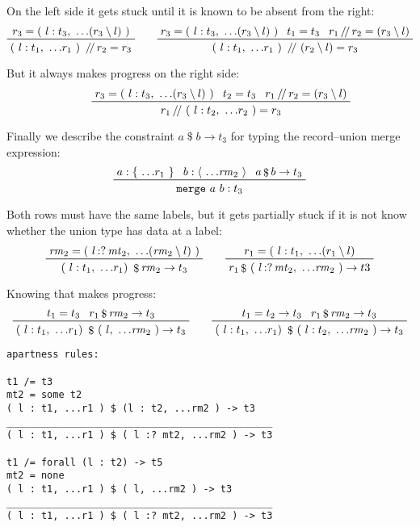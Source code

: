 \documentclass[11pt, twoside, reqno]{book}
\begin{document}
On the left side it gets stuck until it is known to be absent from the right:
\begin{displaymath}
\prftree
  {r_3 = (\ l : t_3,\ \dots\!(r_3 \setminus l)\ )}
  {(\ l : t_1,\ \dots\!r_1\ )\ \mathop{/\!/} r_2 = r_3}
\qquad
\prftree
  {r_3 = (\ l : t_3,\ \dots\!(r_3 \setminus l)\ )}
  {t_1 = t_3}
  {r_1 \mathop{/\!/} r_2 = (r_3 \setminus l)}
  {(\ l : t_1,\ \dots\!r_1\ )\ \mathop{/\!/}\ (r_2 \setminus l) = r_3}
\end{displaymath}

But it always makes progress on the right side:
\begin{displaymath}
\qquad
\prftree
  {r_3 = (\ l : t_3,\ \dots\!(r_3 \setminus l)\ )}
  {t_2 = t_3}
  {r_1 \mathop{/\!/} r_2 = (r_3 \setminus l)}
  {r_1 \mathop{/\!/}\ (\ l : t_2,\ \dots\!r_2\ ) = r_3}
\end{displaymath}

Finally we describe the constraint $a \mathop{\$} b \to t_3$ for typing the record--union merge expression:
\begin{displaymath}
\prftree{a : \{\ \dots\!r_1\ \}}{b : \langle\ \dots\!\mathit{rm}_2\ \rangle}{a \mathop{\$} b \to t_3}{\texttt{merge}\ a\ b : t_3}
\end{displaymath}

Both rows must have the same labels, but it gets partially stuck if it is not know whether the union type has data at a label:
\begin{displaymath}
\prftree{\mathit{rm}_2 = (\ l \mathop{{:}{?}} \mathit{mt}_2,\ \dots\!(\mathit{rm}_2 \setminus l)\ )}{(\ l : t_1,\ \dots\!r_1 )\ \mathop{\$} \mathit{rm}_2 \to t_3}
\qquad
\prftree{r_1 = (\ l : t_1,\ \dots\!(r_1 \setminus l)}{r_1 \mathop{\$}\ (\ l \mathop{{:}{?}} \mathit{mt}_2,\ \dots\!\mathit{rm}_2\ ) \to t3}
\end{displaymath}

Knowing that makes progress:
\begin{displaymath}
\prftree{t_1 = t_3}{r_1 \mathop{\$} \mathit{rm}_2 \to t_3}
  {(\ l : t_1,\ \dots\!r_1 )\ \mathop{\$}\ (\ l,\ \dots\!\mathit{rm}_2\ ) \to t_3}
\qquad
\prftree{t_1 = t_2 \to t_3}{r_1 \mathop{\$} \mathit{rm}_2 \to t_3}
  {(\ l : t_1,\ \dots\!r_1 )\ \mathop{\$}\ (\ l : t_2,\ \dots\!\mathit{rm}_2\ ) \to t_3}
\end{displaymath}

\begin{verbatim}
apartness rules:

t1 /= t3
mt2 = some t2
( l : t1, ...r1 ) $ (l : t2, ...rm2 ) -> t3
______________________________________________
( l : t1, ...r1 ) $ ( l :? mt2, ...rm2 ) -> t3

t1 /= forall (l : t2) -> t5
mt2 = none
( l : t1, ...r1 ) $ ( l, ...rm2 ) -> t3
______________________________________________
( l : t1, ...r1 ) $ ( l :? mt2, ...rm2 ) -> t3
\end{verbatim}
\end{document}

